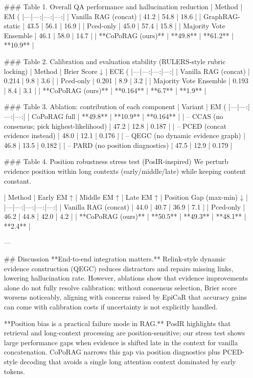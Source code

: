 ### Table 1. Overall QA performance and hallucination reduction  
| Method | EM (%
|---|---:|---:|---:|
| Vanilla RAG (concat) | 41.2 | 54.8 | 18.6 |
| GraphRAG-static | 43.5 | 56.1 | 16.9 |
| Pced-only | 45.0 | 57.4 | 15.8 |
| Majority Vote Ensemble | 46.1 | 58.0 | 14.7 |
| **CoPoRAG (ours)** | **49.8** | **61.2** | **10.9** |

### Table 2. Calibration and evaluation stability (RULERS-style rubric locking)  
| Method | Brier Score ↓ | ECE (%
|---|---:|---:|---:|
| Vanilla RAG (concat) | 0.214 | 9.8 | 3.6 |
| Pced-only | 0.201 | 8.9 | 3.2 |
| Majority Vote Ensemble | 0.193 | 8.4 | 3.1 |
| **CoPoRAG (ours)** | **0.164** | **6.7** | **1.9** |

### Table 3. Ablation: contribution of each component  
| Variant | EM (%
|---|---:|---:|---:|
| CoPoRAG full | **49.8** | **10.9** | **0.164** |
| – CCAS (no consensus; pick highest-likelihood) | 47.2 | 12.8 | 0.187 |
| – PCED (concat evidence instead) | 48.0 | 12.1 | 0.176 |
| – QEGC (no dynamic evidence graph) | 46.8 | 13.5 | 0.182 |
| – PARD (no position diagnostics) | 47.5 | 12.9 | 0.179 |

### Table 4. Position robustness stress test (PosIR-inspired)  
We perturb evidence position within long contexts (early/middle/late) while keeping content constant.

| Method | Early EM ↑ | Middle EM ↑ | Late EM ↑ | Position Gap (max-min) ↓ |
|---|---:|---:|---:|---:|
| Vanilla RAG (concat) | 44.0 | 40.7 | 36.9 | 7.1 |
| Pced-only | 46.2 | 44.8 | 42.0 | 4.2 |
| **CoPoRAG (ours)** | **50.5** | **49.3** | **48.1** | **2.4** |

---

## Discussion  
**End-to-end integration matters.** Relink-style dynamic evidence construction (QEGC) reduces distractors and repairs missing links, lowering hallucination rate. However, ablations show that evidence improvements alone do not fully resolve calibration: without consensus selection, Brier score worsens noticeably, aligning with concerns raised by EpiCaR that accuracy gains can come with calibration costs if uncertainty is not explicitly handled.

**Position bias is a practical failure mode in RAG.** PosIR highlights that retrieval and long-context processing are position-sensitive; our stress test shows large performance gaps when evidence is shifted late in the context for vanilla concatenation. CoPoRAG narrows this gap via position diagnostics plus PCED-style decoding that avoids a single long attention context dominated by early tokens.

